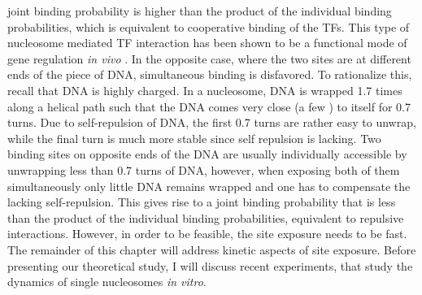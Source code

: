 joint binding probability is higher than the product of the individual binding probabilities, which is
equivalent to cooperative binding of the TFs. This type of nucleosome mediated TF interaction has
been shown to be a functional mode of gene regulation \emph{in vivo} \cite{Miller_MolCellBiol_03}.
In the opposite case, where the two sites
are at different ends of the piece of DNA, simultaneous binding is disfavored. To rationalize this, recall that
DNA is highly charged. In a nucleosome, DNA is wrapped 1.7 times along a helical path such that the  
DNA comes very close (a few \Ang) to itself for 0.7 turns. Due to self-repulsion of DNA, the first
0.7 turns are rather easy to unwrap, while the final turn is much more stable since self repulsion is
lacking. Two binding sites on opposite ends of the DNA are usually individually accessible by unwrapping
less than 0.7 turns of DNA, however, when exposing both of them simultaneously only little DNA remains
wrapped and one has to compensate the lacking self-repulsion. This gives rise to a joint binding probability
that is less than the product of the individual binding probabilities, equivalent to repulsive interactions. 
However, in order to be feasible, the site exposure needs to be fast. The remainder of this chapter will
address kinetic aspects of site exposure. Before presenting our theoretical study, 
I will discuss recent experiments, that study the dynamics of single nucleosomes  \emph{in 
vitro}.

